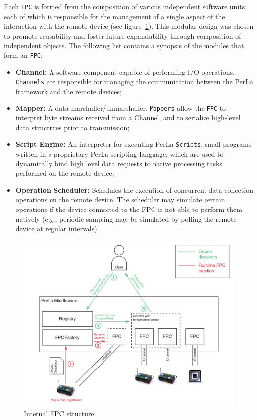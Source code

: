 Each \texttt{FPC} is formed from the composition of various independent
software units, each of which is responsible for the management of a single
aspect of the interaction with the remote device (see
figure~\ref{fig:fpc_overview}). This modular design was chosen to promote
reusability and foster future expandability through composition of
independent objects. The following list contains a synopsis of the modules
that form an \texttt{FPC}:

\begin{itemize}

    \item \textbf{Channel:} A software component capable of performing I/O
    operations. \texttt{Channels} are responsible for managing the
    communication between the PerLa framework and the remote devices;

    \item \textbf{Mapper:} A data marshaller/unmarshaller. \texttt{Mappers}
    allow the \texttt{FPC} to interpret byte streams received from a Channel,
    and to serialize high-level data structures prior to transmission;

    \item \textbf{Script Engine:} An interpreter for executing PerLa
    \texttt{Scripts}, small programs written in a proprietary PerLa scripting
    language, which are used to dynamically bind high level data requests to
    native processing tasks performed on the remote device;

    \item \textbf{Operation Scheduler:} Schedules the execution of concurrent
    data collection operations on the remote device. The scheduler may simulate
    certain operations if the device connected to the FPC is not able to
    perform them natively (e.g., periodic sampling may be simulated by polling
    the remote device at regular intervals).

\end{itemize}

\begin{figure}[h!]
\includegraphics[width=\textwidth]{imgs/middleware_overview.pdf}
\caption{Internal FPC structure}
\label{fig:fpc_overview}
\end{figure}


